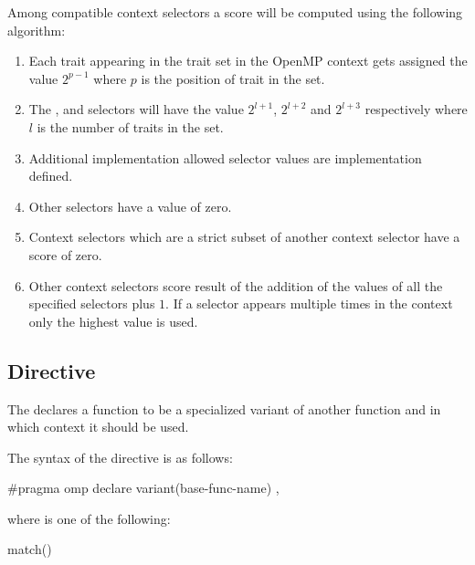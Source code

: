\begin{itemize}
\begin{itemize}
Among compatible context selectors a score will be computed using the following algorithm:
\begin{enumerate}
 \item Each trait appearing in the  trait set in the OpenMP context gets assigned the value $2^{p-1}$ where $p$ is the position of trait in the set.
 \item The ,  and  selectors will have the value $2^{l+1}$, $2^{l+2}$ and $2^{l+3}$ respectively where $l$ is the number of traits in the  set.
 \item Additional implementation allowed selector values are implementation defined.
 \item Other selectors have a value of zero.
 \item Context selectors which are a strict subset of another context selector have a score of zero.
 \item Other context selectors score result of the addition of the values of all the specified selectors plus $1$. If a  selector appears multiple times in the context only the highest value is used.
\end{enumerate}

\subsection{ Directive}
\label{subsec:declare variant Directive}
\summary
The  declares a function to be a specialized variant of another function and in which context it should be used.

\syntax
\begin{ccppspecific}
\begin{samepage}
The syntax of the  directive is as follows:

\begin{ompcPragma}
#pragma omp declare variant(base-func-name) \plc{[clause[ [},\plc{] clause] ... ] new-line}
\end{ompcPragma}
\end{samepage}

\begin{samepage}
where  is one of the following{}:

\begin{indentedcodelist}
match()
\end{indentedcodelist}
\end{samepage}
\end{ccppspecific}


\end{itemize}
\end{itemize}
